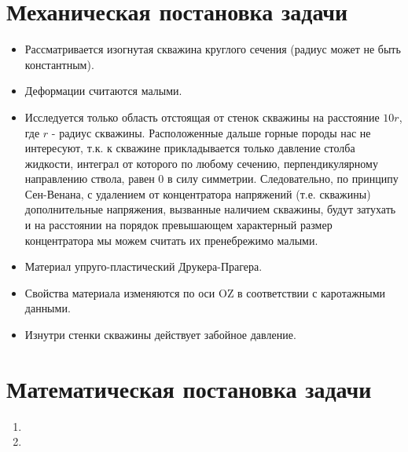 \documentclass[a4paper,14pt]{scrartcl}
\begin{document}
\section{Механическая постановка задачи}
\begin{itemize}
    \item Рассматривается изогнутая скважина круглого сечения (радиус может не быть константным).
    \item Деформации считаются малыми.
    \item Исследуется только область отстоящая от стенок скважины на расстояние $10r$, где $r$ - радиус скважины. Расположенные дальше горные породы нас не интересуют, т.к. к скважине прикладывается только давление столба жидкости, интеграл от которого по любому сечению, перпендикулярному направлению ствола, равен $0$ в силу симметрии. Следовательно, по принципу Сен-Венана, с удалением от концентратора напряжений (т.е. скважины) дополнительные напряжения, вызванные наличием скважины, будут затухать и на расстоянии на порядок превышающем характерный размер концентратора мы можем считать их пренебрежимо малыми.
    \item Материал упруго-пластический Друкера-Прагера.
    \item Свойства материала изменяются по оси OZ в соответствии с каротажными данными.
    \item Изнутри стенки скважины действует забойное давление.
\end{itemize}


\newpage
\section{Математическая постановка задачи}
\begin{enumerate}
    \item \blindtext
    \item \blindtext
\end{enumerate}
\end{document}
